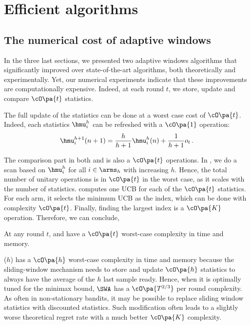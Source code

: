 \section{Efficient algorithms}
\label{sec:fast}
\subsection{The numerical cost of adaptive windows}

In the three last sections, we presented two adaptive windows algorithms that significantly improved over state-of-the-art algorithms, both theoretically and experimentally. Yet, our numerical experiments indicate that these improvements are computationally expensive. Indeed, at each round $t$, we store, update and compare $\cO\pa{t}$ statistics. 

The full update of the statistics can be done at a worst case cost of $\cO\pa{t}$. Indeed, each statistics $\hmu_i^h$ can be refreshed with a $\cO\pa{1}$ operation: 
\[\hmu_i^{h+1}(n+1) = \frac{h}{h+1}\hmu_i^{h}(n) + \frac{1}{h+1}o_t \,. \]

The comparison part in both \FEWA and \RUCB is also a $\cO\pa{t}$ operations. In \FEWA , we do a scan based on $\hmu_i^{h}$ for all $i \in \arms_h$ with increasing $h$. Hence, the total number of unitary operations is in $\cO\pa{t}$ in the worst case, as it scales with the number of statistics. \RUCB computes one UCB for each of the $\cO\pa{t}$ statistics. For each arm, it selects the minimum UCB as the index, which can be done with complexity $\cO\pa{t}$. Finally, finding the largest index is a $\cO\pa{K}$ operation. Therefore, we can conclude,

\begin{proposition}
At any round $t$, \FEWA and \RUCB have a $\cO\pa{t}$ worst-case complexity in time and memory.
\end{proposition}

\begin{remark}
\SWA($h$) has a $\cO\pa{h}$ worst-case complexity in time and memory because the sliding-window mechanism needs to store and update $\cO\pa{h}$ statistics to always have the average of the $h$ last sample ready. Hence, when it is optimally tuned for the minimax bound, $\SWA$ has a $\cO\pa{T^{2/3}}$ per round complexity. As often in non-stationary bandits, it may be possible to replace sliding window statistics with discounted statistics. Such modification often leads to a slightly worse theoretical regret rate with a much better $\cO\pa{K}$ complexity. 
\end{remark}

